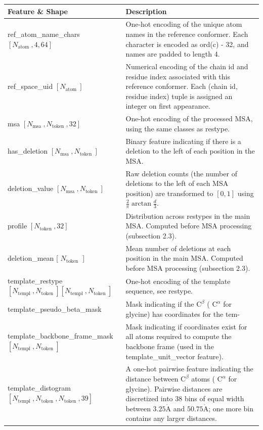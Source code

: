 \documentclass[10pt]{article}
\def\AA{\mathring{\mathrm{A}}}
\begin{document}
\begin{center}
\begin{tabular}{|l|l|}
\hline
Feature \& Shape & Description \\
\hline
ref\_atom\_name\_chars $\left[N_{\text {atom }}, 4,64\right]$ & One-hot encoding of the unique atom names in the reference conformer. Each character is encoded as ord(c) - 32, and names are padded to length 4. \\
\hline
ref\_space\_uid $\left[N_{\text {atom }}\right]$ & Numerical encoding of the chain id and residue index associated with this reference conformer. Each (chain id, residue index) tuple is assigned an integer on first appearance. \\
\hline
msa $\left[N_{\text {msa }}, N_{\text {token }}, 32\right]$ & One-hot encoding of the processed MSA, using the same classes as restype. \\
\hline
has\_deletion $\left[N_{\text {msa }}, N_{\text {token }}\right]$ & Binary feature indicating if there is a deletion to the left of each position in the MSA. \\
\hline
deletion\_value $\left[N_{\text {msa }}, N_{\text {token }}\right]$ & Raw deletion counts (the number of deletions to the left of each MSA position) are transformed to $[0,1]$ using $\frac{2}{\pi} \arctan \frac{d}{3}$. \\
\hline
profile $\left[N_{\text {token }}, 32\right]$ & Distribution across restypes in the main MSA. Computed before MSA processing (subsection 2.3). \\
\hline
deletion\_mean [ $N_{\text {token }}$ ] & Mean number of deletions at each position in the main MSA. Computed before MSA processing (subsection 2.3). \\
\hline
template\_restype $\left[N_{\text {templ }}, N_{\text {token }}\right] \left[N_{\text {templ }}, N_{\text {token }}\right]$ & One-hot encoding of the template sequence, see restype. \\
\hline
template\_pseudo\_beta\_mask & Mask indicating if the $\mathrm{C}^{\beta}$ ( $\mathrm{C}^{\alpha}$ for glycine) has coordinates for the tem- \\
\hline
template\_backbone\_frame\_mask $\left[N_{\text {templ }}, N_{\text {token }}\right]$ & Mask indicating if coordinates exist for all atoms required to compute the backbone frame (used in the template\_unit\_vector feature). \\
\hline
template\_distogram $\left[N_{\text {templ }}, N_{\text {token }}, N_{\text {token }}, 39\right]$ & A one-hot pairwise feature indicating the distance between $\mathrm{C}^{\beta}$ atoms ( $\mathrm{C}^{\alpha}$ for glycine). Pairwise distances are discretized into 38 bins of equal width between $3.25 \AA$ and $50.75 \AA$; one more bin contains any larger distances. \\

\end{tabular}
\end{center}
\end{document}
